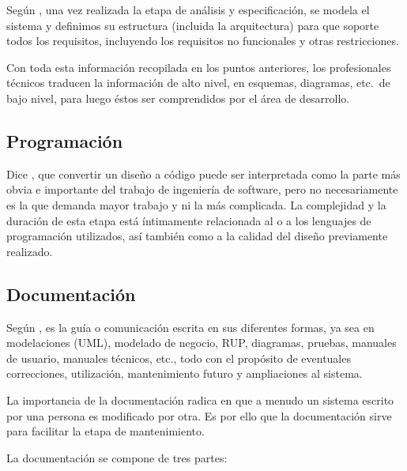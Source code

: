 \documentclass[12pt]{article}
\begin{document}
	Según \textcite{maida_metodologias_2015}, una vez realizada la etapa de análisis y especificación, se modela el sistema y definimos su estructura (incluida la arquitectura) para que soporte todos los requisitos, incluyendo los requisitos no funcionales y otras restricciones.

	Con toda esta información recopilada en los puntos anteriores, los profesionales técnicos traducen la información de alto nivel, en esquemas, diagramas, etc.\ de bajo nivel, para luego éstos ser
	comprendidos por el área de desarrollo.

	\subsection{Programación}

	Dice \textcite{maida_metodologias_2015}, que convertir un diseño a código puede ser interpretada como la parte más obvia e importante del trabajo de ingeniería de software, pero no necesariamente es la que demanda mayor trabajo y ni la más complicada. La complejidad y la duración de esta etapa está íntimamente relacionada al o a los lenguajes de programación utilizados, así también como a la calidad del diseño previamente realizado.

	\subsection{Documentación}

	Según \textcite{maida_metodologias_2015}, es la guía o comunicación escrita en sus diferentes formas, ya sea en modelaciones (UML), modelado de negocio, RUP, diagramas, pruebas, manuales de usuario, manuales técnicos, etc., todo con el propósito de eventuales correcciones, utilización, mantenimiento futuro y ampliaciones al sistema.

	La importancia de la documentación radica en que a menudo un sistema escrito por una persona es modificado por otra. Es por ello que la documentación sirve para facilitar la etapa de mantenimiento.

	La documentación se compone de tres partes:
\end{document}
